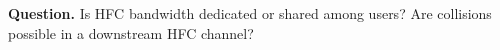 \textbf{Question.} Is HFC bandwidth dedicated or shared among users?
Are collisions possible in a downstream HFC channel?
